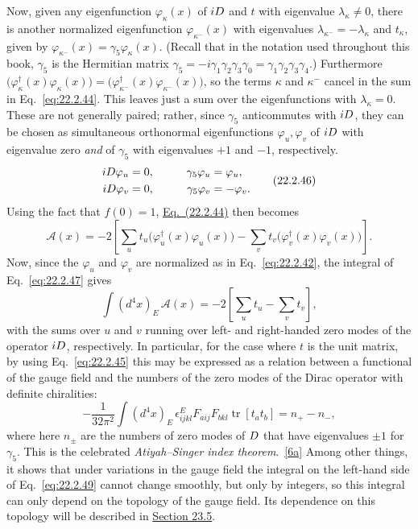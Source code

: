 Now, given any eigenfunction $\varphi_\kappa(x)$ of $i\sl{D}$ and $t$ with
eigenvalue $\lambda_\kappa\ne0$, there is another normalized eigenfunction
$\varphi_{\kappa^-}(x)$ with eigenvalues
$\lambda_{\kappa^-}=-\lambda_\kappa$ and $t_\kappa$, given by
$\varphi_{\kappa^-}(x)=\gamma_5\varphi_\kappa(x)$. (Recall that in the
notation used throughout this book, $\gamma_5$ is the Hermitian matrix
$\gamma_5=-i\gamma_1\gamma_2\gamma_3\gamma_0
=\gamma_1\gamma_2\gamma_3\gamma_4$.) Furthermore
$\bigl(\varphi_\kappa^\dagger(x)\varphi_\kappa(x)\bigr)
=\bigl(\varphi_{\kappa^-}^\dagger(x)\varphi_{\kappa^-}(x)\bigr)$, so the
terms $\kappa$ and $\kappa^-$ cancel in the sum in
Eq.~\eqref{eq:22.2.44}. This leaves just a sum over the eigenfunctions with
$\lambda_\kappa=0$. These are not generally paired; rather, since
$\gamma_5$ anticommutes with $i\sl{D}$, they can be chosen as simultaneous
orthonormal eigenfunctions $\varphi_u,\varphi_v$ of $i\sl{D}$ with
eigenvalue zero \emph{and} of $\gamma_5$ with eigenvalues $+1$ and $-1$,
respectively.
\begin{equation}
 \begin{aligned}
 i\sl{D}\varphi_u&=0,&\qquad \gamma_5\varphi_u&=\varphi_u,\\
 i\sl{D}\varphi_v&=0,& \gamma_5\varphi_v&=-\varphi_v.
 \end{aligned}
 \tag{22.2.46}\label{eq:22.2.46}
\end{equation}
Using the fact that $f(0)=1$,
\hyperref[eq:22.2.44]{Eq.~(22.2.44)} then becomes
\begin{equation}
 \mathcal A(x)=-2\left[
 \sum_u t_u\bigl(\varphi_u^\dagger(x)\varphi_u(x)\bigr)
 -\sum_v t_v\bigl(\varphi_v^\dagger(x)\varphi_v(x)\bigr)
 \right].
 \tag{22.2.47}\label{eq:22.2.47}
\end{equation}
Now, since the $\varphi_u$ and $\varphi_v$ are normalized as in
Eq.~\eqref{eq:22.2.42}, the integral of Eq.~\eqref{eq:22.2.47} gives
\begin{equation}
 \int(d^4x)_E\,\mathcal A(x)
 =-2\left[\sum_u t_u-\sum_v t_v\right],
 \tag{22.2.48}\label{eq:22.2.48}
\end{equation}
with the sums over $u$ and $v$ running over left- and right-handed zero
modes of the operator $i\sl{D}$, respectively. In particular, for the case
where $t$ is the unit matrix, by using Eq.~\eqref{eq:22.2.45} this may be
expressed as a relation between a functional of the gauge field and the
numbers of the zero modes of the Dirac operator with definite chiralities:
\begin{equation}
 -\frac{1}{32\pi^2}\int(d^4x)_E\,\epsilon^E_{ijkl}
 F_{a ij}F_{b kl}\operatorname{tr}[t_a t_b]
 =n_+-n_-,
 \tag{22.2.49}\label{eq:22.2.49}
\end{equation}
where here $n_\pm$ are the numbers of zero modes of $\sl{D}$ that have
eigenvalues $\pm1$ for $\gamma_5$. This is the celebrated
\emph{Atiyah--Singer index theorem}.~\hyperref[ch22-ref-6a]{[6a]} Among
other things, it shows that under variations in the gauge field the integral
on the left-hand side of Eq.~\eqref{eq:22.2.49} cannot change smoothly,
but only by integers, so this integral can only depend on the topology of
the gauge field. Its dependence on this topology will be described in
\hyperref[sec:23.5]{Section 23.5}.
